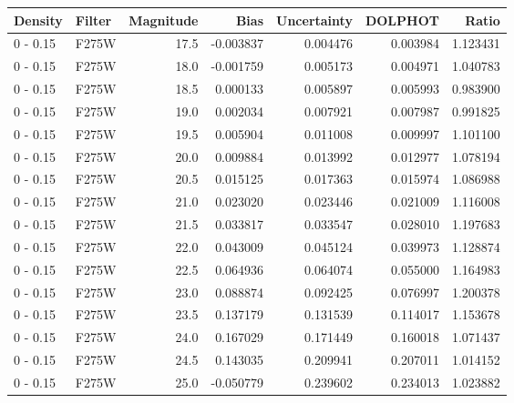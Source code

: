 \begin{tabular}{llrrrrr}
\toprule
  Density & Filter &  Magnitude &      Bias &  Uncertainty &   DOLPHOT &     Ratio \\
\midrule
 0 - 0.15 &  F275W &       17.5 & -0.003837 &     0.004476 &  0.003984 &  1.123431 \\
 0 - 0.15 &  F275W &       18.0 & -0.001759 &     0.005173 &  0.004971 &  1.040783 \\
 0 - 0.15 &  F275W &       18.5 &  0.000133 &     0.005897 &  0.005993 &  0.983900 \\
 0 - 0.15 &  F275W &       19.0 &  0.002034 &     0.007921 &  0.007987 &  0.991825 \\
 0 - 0.15 &  F275W &       19.5 &  0.005904 &     0.011008 &  0.009997 &  1.101100 \\
 0 - 0.15 &  F275W &       20.0 &  0.009884 &     0.013992 &  0.012977 &  1.078194 \\
 0 - 0.15 &  F275W &       20.5 &  0.015125 &     0.017363 &  0.015974 &  1.086988 \\
 0 - 0.15 &  F275W &       21.0 &  0.023020 &     0.023446 &  0.021009 &  1.116008 \\
 0 - 0.15 &  F275W &       21.5 &  0.033817 &     0.033547 &  0.028010 &  1.197683 \\
 0 - 0.15 &  F275W &       22.0 &  0.043009 &     0.045124 &  0.039973 &  1.128874 \\
 0 - 0.15 &  F275W &       22.5 &  0.064936 &     0.064074 &  0.055000 &  1.164983 \\
 0 - 0.15 &  F275W &       23.0 &  0.088874 &     0.092425 &  0.076997 &  1.200378 \\
 0 - 0.15 &  F275W &       23.5 &  0.137179 &     0.131539 &  0.114017 &  1.153678 \\
 0 - 0.15 &  F275W &       24.0 &  0.167029 &     0.171449 &  0.160018 &  1.071437 \\
 0 - 0.15 &  F275W &       24.5 &  0.143035 &     0.209941 &  0.207011 &  1.014152 \\
 0 - 0.15 &  F275W &       25.0 & -0.050779 &     0.239602 &  0.234013 &  1.023882 \\
\bottomrule
\end{tabular}
